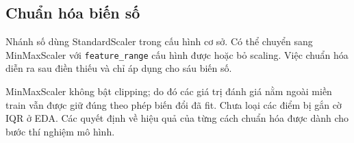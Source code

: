 \subsection{Chuẩn hóa biến số}
\label{subsec:4_3_3}
Nhánh số dùng StandardScaler trong cấu hình cơ sở. Có thể chuyển sang MinMaxScaler với \texttt{feature\_range} cấu hình được hoặc bỏ scaling. Việc chuẩn hóa diễn ra sau điền thiếu và chỉ áp dụng cho sáu biến số.

MinMaxScaler không bật clipping; do đó các giá trị đánh giá nằm ngoài miền train vẫn được giữ đúng theo phép biến đổi đã fit. Chưa loại các điểm bị gắn cờ IQR ở EDA. Các quyết định về hiệu quả của từng cách chuẩn hóa được dành cho bước thí nghiệm mô hình.
